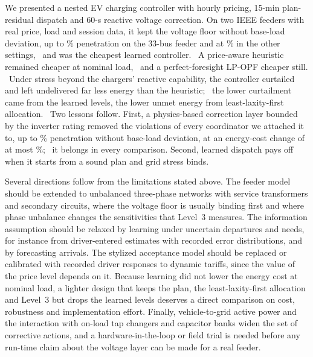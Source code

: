 We presented a nested EV charging controller with hourly pricing, 15-min
plan-residual dispatch and 60-s reactive voltage correction. On two IEEE
feeders with real price, load and session data, it kept the voltage floor
without base-load deviation, up to \GPenSFive\% penetration on the
33-bus feeder and at \GPenSThree\% in the other settings,%
\ and was the cheapest learned controller.%
\ A price-aware heuristic remained cheaper at nominal load,%
\ and a perfect-foresight LP-OPF cheaper still.%
\ Under stress beyond the chargers' reactive capability, the controller
curtailed and left undelivered far less energy than the heuristic;%
\ the lower curtailment came from the learned levels, the lower unmet energy
from least-laxity-first allocation.%
\ Two lessons follow. First, a physics-based correction layer bounded by the
inverter rating removed the violations of every coordinator we attached it to,
up to \GPenSFive\% penetration without base-load deviation, at an
energy-cost change of at most \GLThreeCostChangeMax\%;%
\ it belongs in every comparison. Second, learned dispatch pays off when it
starts from a sound plan and grid stress binds.

Several directions follow from the limitations stated above. The feeder model
should be extended to unbalanced three-phase networks with service
transformers and secondary circuits, where the voltage floor is usually
binding first and where phase unbalance changes the sensitivities that
Level~3 measures. The information assumption should be relaxed by learning
under uncertain departures and needs, for instance from driver-entered
estimates with recorded error distributions, and by forecasting arrivals.
The stylized acceptance model should be replaced or calibrated with recorded
driver responses to dynamic tariffs, since the value of the price level
depends on it. Because learning did not lower the energy cost at nominal
load, a lighter design that keeps the plan, the least-laxity-first allocation
and Level~3 but drops the learned levels deserves a direct comparison on cost,
robustness and implementation effort. Finally, vehicle-to-grid active power
and the interaction with on-load tap changers and capacitor banks widen the
set of corrective actions, and a hardware-in-the-loop or field trial is
needed before any run-time claim about the voltage layer can be made for a
real feeder.

